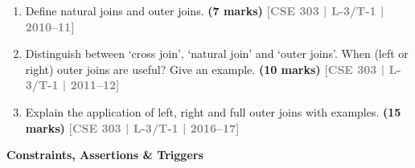 \documentclass[12pt,a3paper]{article}
\newcommand{\yr}[1]{\hfill\textcolor{gray}{\small\textbf{[#1]}}}
\newcommand{\mk}[1]{\textcolor{orange!70!black}{\small\textbf{(#1 marks)}}}
\newcommand{\subtopic}[2]{%
  \vspace{10pt}
  \noindent\begin{tcolorbox}[colback=#1!8,colframe=#1,boxrule=0.6pt,arc=4pt,
    left=6pt,right=6pt,top=4pt,bottom=4pt]
    \small\bfseries\textcolor{#1}{#2}
  \end{tcolorbox}
  \vspace{2pt}
}
\begin{document}
\begin{enumerate}

\item Define natural joins and outer joins.
\mk{7} \yr{CSE 303 | L-3/T-1 | 2010--11}

\item Distinguish between `cross join', `natural join' and `outer joins'. When (left or right) outer joins are useful? Give an example.
\mk{10} \yr{CSE 303 | L-3/T-1 | 2011--12}

\item Explain the application of left, right and full outer joins with examples.
\mk{15} \yr{CSE 303 | L-3/T-1 | 2016--17}

\end{enumerate}

\subtopic{cB}{Constraints, Assertions \& Triggers}
\label{sub:s3-constraints}
\end{document}
